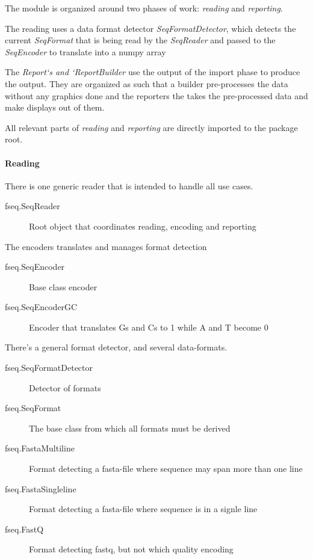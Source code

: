 \documentclass[letterpaper,10pt,english]{sphinxmanual}
\begin{document}
The module is organized around two phases of work: \emph{reading} and \emph{reporting}.

The reading uses a data format detector \emph{SeqFormatDetector}, which detects
the current \emph{SeqFormat} that is being read by the \emph{SeqReader} and passed to the
\emph{SeqEncoder} to translate into a numpy array

The \emph{Report{}`s and {}`ReportBuilder} use the output of the import phase to produce
the output. They are organized as such that a builder pre-processes the data
without any graphics done and the reporters the takes the pre-processed data
and make displays out of them.

All relevant parts of \emph{reading} and \emph{reporting} are directly imported to the
package root.


\paragraph{Reading}
\label{fseq:reading}
There is one generic reader that is intended to handle all use cases.
\begin{description}
\item[{fseq.SeqReader}] \leavevmode
Root object that coordinates reading, encoding and reporting

\end{description}

The encoders translates and manages format detection
\begin{description}
\item[{fseq.SeqEncoder}] \leavevmode
Base class encoder

\item[{fseq.SeqEncoderGC}] \leavevmode
Encoder that translates Gs and Cs to 1 while A and T become 0

\end{description}

There's a general format detector, and several data-formats.
\begin{description}
\item[{fseq.SeqFormatDetector}] \leavevmode
Detector of formats

\item[{fseq.SeqFormat}] \leavevmode
The base class from which all formats must be derived

\item[{fseq.FastaMultiline}] \leavevmode
Format detecting a fasta-file where sequence may span more than one line

\item[{fseq.FastaSingleline}] \leavevmode
Format detecting a fasta-file where sequence is in a signle line

\item[{fseq.FastQ}] \leavevmode
Format detecting fastq, but not which quality encoding

\end{description}
\end{document}

